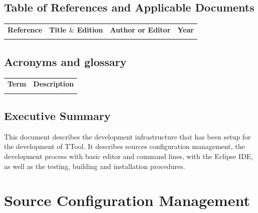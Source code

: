 \documentclass[12pt]{article}
\begin{document}
\subsection{Table of References and Applicable Documents}

\begin{table}[H]
\large
\centering
\begin{adjustbox}{width=\textwidth}
\begin{tabular}{ |p{2.66in}|p{2.66in}|p{0.95in}|p{0.43in}| }
\hhline{----}
\textbf{Reference} & \textbf{Title  $  \&  $  Edition} & \textbf{Author or
Editor} & \textbf{Year}
\\
\hhline{----}
 &  &  &  \\ 
\hline
\end{tabular}
\end{adjustbox}
\end{table}

\subsection{Acronyms and glossary}

\begin{table}[H]
\large
\centering
\begin{adjustbox}{width=\textwidth}
\begin{tabular}{ |p{1.24in}|p{5.45in}| }
\hhline{--}
\textbf{Term} & \textbf{Description} \\ 
\hhline{--}
 &  \\ 
\hline
\end{tabular}
\end{adjustbox}
\end{table}

\subsection{Executive Summary}

This document describes the development infrastructure that has been setup for
the development of TTool. It describes sources configuration management, the
development process with basic editor and command lines, with the Eclipse IDE,
as well as the testing, building and installation procedures.

\section{Source Configuration Management}
\label{sec:scm}
\end{document}
